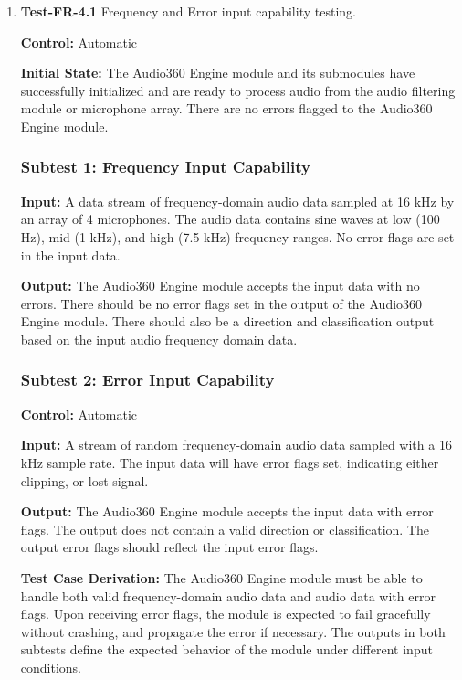 \documentclass[12pt, titlepage]{article}
\begin{document}
\begin{enumerate}
\item{\textbf{Test-FR-4.1} Frequency and Error input capability testing.\\}

\textbf{Control:} Automatic

\textbf{Initial State:}
The Audio360 Engine module and its submodules have successfully initialized and
are ready to process audio from the audio filtering module or microphone array.
There are no errors flagged to the Audio360 Engine module.

\subsubsection*{Subtest 1: Frequency Input Capability}
\textbf{Input:}
A data stream of frequency-domain audio data sampled at 16 kHz by an array of 4
microphones. The audio data contains sine waves at low (100 Hz), mid (1 kHz),
and high (7.5 kHz) frequency ranges. No error flags are set in the input data.

\textbf{Output:}
The Audio360 Engine module accepts the input data with no errors. There should
be no error flags set in the output of the Audio360 Engine module. There should
also be a direction and classification output based on the input audio frequency
domain data.

\subsubsection*{Subtest 2: Error Input Capability}

\textbf{Control:} Automatic

\textbf{Input:}
A stream of random frequency-domain audio data sampled with a 16 kHz sample
rate. The input data will have error flags set, indicating either clipping, 
or lost signal.

\textbf{Output:}
The Audio360 Engine module accepts the input data with error flags. The output
does not contain a valid direction or classification. The output error flags
should reflect the input error flags.

\textbf{Test Case Derivation:}
The Audio360 Engine module must be able to handle both valid frequency-domain
audio data and audio data with error flags. Upon receiving error flags, the
module is expected to fail gracefully without crashing, and propagate the error
if necessary. The outputs in both subtests define the expected behavior of the
module under different input conditions.


\end{enumerate}
\end{document}
